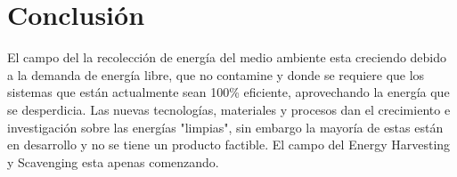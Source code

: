 \documentclass[journal, a4paper]{IEEEtran}
\begin{document}
\section{Conclusión}
El campo del la recolección de energía del medio ambiente esta creciendo debido a la demanda de energía libre, que no contamine y donde se requiere que los sistemas que están actualmente sean 100\% eficiente, aprovechando la energía que se desperdicia. Las nuevas tecnologías, materiales y procesos dan el crecimiento e investigación sobre las energías "limpias", sin embargo la mayoría de estas están en desarrollo y no se tiene un producto factible. El campo del Energy Harvesting y Scavenging esta apenas comenzando.  





\end{document}
